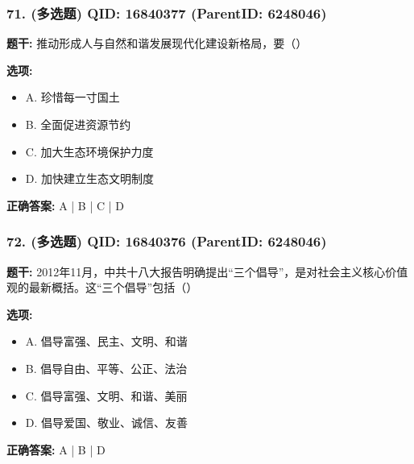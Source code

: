 \documentclass[12pt,UTF8]{ctexart}
\begin{document}
\subsubsection*{71. (多选题) \small QID: 16840377 (ParentID: 6248046)}

\textbf{题干:}
推动形成人与自然和谐发展现代化建设新格局，要（）



\textbf{选项:}
\begin{itemize}[leftmargin=*]

  \item A. 珍惜每一寸国土

  \item B. 全面促进资源节约

  \item C. 加大生态环境保护力度

  \item D. 加快建立生态文明制度

\end{itemize}

\textbf{正确答案:}
A | B | C | D

\vspace{0.3em}\hrulefill\vspace{0.7em}

\subsubsection*{72. (多选题) \small QID: 16840376 (ParentID: 6248046)}

\textbf{题干:}
2012年11月，中共十八大报告明确提出“三个倡导”，是对社会主义核心价值观的最新概括。这“三个倡导”包括（）



\textbf{选项:}
\begin{itemize}[leftmargin=*]

  \item A. 倡导富强、民主、文明、和谐

  \item B. 倡导自由、平等、公正、法治

  \item C. 倡导富强、文明、和谐、美丽

  \item D. 倡导爱国、敬业、诚信、友善

\end{itemize}

\textbf{正确答案:}
A | B | D

\vspace{0.3em}\hrulefill\vspace{0.7em}
\end{document}
